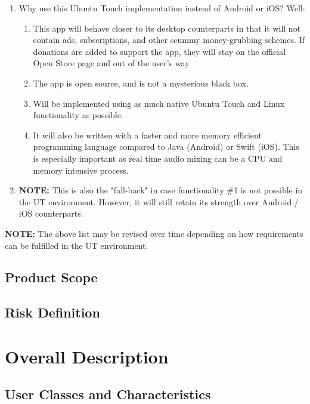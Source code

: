 \begin{enumerate}
\begin{enumerate}
		\item Why use this Ubuntu Touch implementation instead of Android or iOS? Well:
		\begin{enumerate}
			\item This app will behave closer to its desktop counterparts in that it will not contain ads, subscriptions, and other scummy money-grubbing schemes. If donations are added to support the app, they will stay on the official Open Store page and out of the user's way.
			\item The app is open source, and is not a mysterious black box.
			\item Will be implemented using as much native Ubuntu Touch and Linux functionality as possible.
			\item It will also be written with a faster and more memory efficient programming language compared to Java (Android) or Swift (iOS). This is especially important as real time audio mixing can be a CPU and memory intensive process.
		\end{enumerate}
		
		\item \textbf{NOTE: } This is also the "fall-back" in case functionality \#1 is not possible in the UT environment. However, it will still retain its strength over Android / iOS counterparts.
	\end{enumerate}
\end{enumerate}


\textbf{NOTE:} The above list may be revised over time depending on how requirements can be fulfilled in the UT environment.


\section{Product Scope}



\section{Risk Definition} 



\chapter{Overall Description}
\label{Overall Description}

\section{User Classes and Characteristics}

